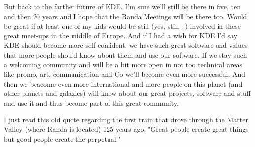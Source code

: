 But back to the farther future of KDE. I'm sure we'll still be there in five, ten and then 20 years and I hope that the Randa Meetings will be there too. Would be great if at least one of my kids would be still (yes, still ;-) involved in these great meet-ups in the middle of Europe. And if I had a wish for KDE I'd say KDE should become more self-confident: we have such great software and values that more people should know about them and use our software. If we stay such a welcoming community and will be a bit more open in not too technical areas like promo, art, communication and Co we'll become even more successful. And then we beacome even more international and more people on this planet (and other planets and galaxies) will know about our great projects, software and stuff and use it and thus become part of this great community.

I just read this old quote regarding the first train that drove through the Matter Valley (where Randa is located) 125 years ago: "Great people create great things but good people create the perpetual."